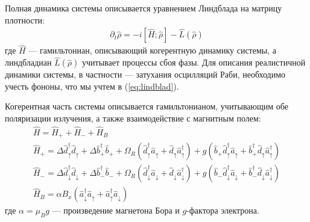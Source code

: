\documentclass[11pt]{article}    %
\numberwithin{equation}{section}
\begin{document}
\par
Полная динамика системы описывается уравнением Линдблада на матрицу
плотности:
\begin{gather}
    \partial_t \hat{\rho} = -i \left[ \hat{H} ; \hat{\rho} \right] - \hat{L}(\hat{\rho})
    \label{eq:lindblad}
\end{gather}
где $\hat{H}$ --- гамильтониан, описывающий когерентную динамику системы,
а линдбладиан $\hat{L}(\hat{\rho})$ учитывает процессы сбоя фазы.
Для описания реалистичной динамики системы, в частности ---
затухания осцилляций Раби, необходимо учесть фононы, что мы учтем в (\ref{eq:lindblad}).

Когерентная часть системы описывается гамильтонианом, учитывающим обе
поляризации излучения, а также взаимодействие с магнитным полем:
\begin{gather}
    \hat{H} = \hat{H}_{+} + \hat{H}_{-} + \hat{H}_{B} \\ \nonumber
    \hat{H}_{+} = \Delta \hat{d}^{\dag}_{\uparrow} \hat{d}_{\uparrow} + \Delta \hat{b}^{\dag}_{+} \hat{b}_{+} + \Omega_R \left( \hat{d}^{\dag}_{\uparrow} \hat{a}_{\uparrow}
    +  \hat{d}_{\uparrow} \hat{a}^{\dag}_{\uparrow} \right) + g \left( \hat{b}_{+} \hat{d}^{\dag}_{\uparrow} \hat{a}_{\uparrow}
    +  \hat{b}^{\dag}_{+} \hat{d}_{\uparrow} \hat{a}^{\dag}_{\uparrow} \right) \\ \nonumber
    \hat{H}_{-} = \Delta \hat{d}^{\dag}_{\downarrow} \hat{d}_{\downarrow} + \Delta \hat{b}^{\dag}_{-} \hat{b}_{-} + \Omega_R \left( \hat{d}^{\dag}_{\downarrow} \hat{a}_{\downarrow}
    +  \hat{d}_{\downarrow} \hat{a}^{\dag}_{\downarrow} \right) + g \left( \hat{b}_{-} \hat{d}^{\dag}_{\downarrow} \hat{a}_{\downarrow}
    +  \hat{b}^{\dag}_{-} \hat{d}_{\downarrow} \hat{a}^{\dag}_{\downarrow} \right) \\ \nonumber
    \hat{H}_{B} = \alpha B_x \left( \hat{a}^{\dag}_{\downarrow} \hat{a}_{\uparrow} + \hat{a}^{\dag}_{\uparrow} \hat{a}_{\downarrow}  \right) \nonumber
\end{gather}
где $\alpha = \mu_B g $ --- произведение магнетона Бора и $g$-фактора электрона.
\end{document}
